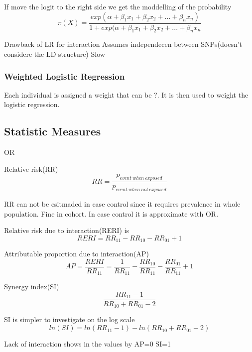 \documentclass[10pt,a4paper]{report}
\begin{document}
If move the logit to the right side we get the moddelling of the probability
\begin{equation}
\pi(X)=\frac{exp(\alpha+\beta_1 x_1+\beta_2 x_2+...+\beta_n x_n)}{1+exp(\alpha+\beta_1 x_1+\beta_2 x_2+...+\beta_n x_n}
\end{equation}


Drawback of LR for interaction
Assumes independecen between SNPs(doesn't considere the LD structure)
Slow

\subsubsection{Weighted Logistic Regression}
Each individual is assigned a weight that can be ?. It is then used to weight the logistic regression.

\subsection{Statistic Measures}
OR

Relative risk(RR)
\begin{equation}
RR=\frac{p_{event\:when\:exposed}}{p_{event\:when\:not\:exposed}}
\end{equation}

RR can not be esitmaded in case control since it requires prevalence in whole population. Fine in cohort. In case control it is approximate with OR.

Relative risk due to interaction(RERI) is
\begin{equation}
RERI=RR_{11}-RR_{10}-RR_{01}+1
\end{equation}

Attributable proportion due to interaction(AP)
\begin{equation}
AP=\frac{RERI}{RR_{11}}=\frac{1}{RR_{11}}-\frac{RR_{10}}{RR_{11}}-\frac{RR_{01}}{RR_{11}}+1
\end{equation}

Synergy index(SI)
\begin{equation}
\frac{RR_{11}-1}{RR_{10}+RR_{01}-2}
\end{equation}

SI is simpler to investigate on the log scale
\begin{equation}
ln(SI)=ln(RR_{11}-1)-ln(RR_{10}+RR_{01}-2)
\end{equation}

Lack of interaction shows in the values by
AP=0
SI=1
\end{document}
